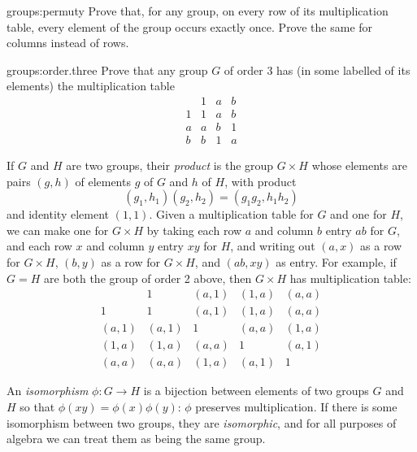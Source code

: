 \begin{problem}{groups:permuty}
Prove that, for any group, on every row of its multiplication table, every element of the group occurs exactly once.
Prove the same for columns instead of rows.
\end{problem}
\begin{problem}{groups:order.three}
Prove that any group \(G\) of order 3 has (in some labelled of its elements) the multiplication table
\[
\begin{array}{c|ccc}
  &  1 & a & b \\ \hline
1 &  1 & a & b \\
a &  a & b & 1 \\
b &  b & 1 & a
\end{array}
\]
\end{problem}

If \(G\) and \(H\) are two groups, their \emph{product} is the group \(G \times H\) whose elements are pairs \((g,h)\) of elements \(g\) of \(G\) and \(h\) of \(H\), with product
\[
(g_1,h_1)(g_2,h_2)=(g_1g_2,h_1h_2)
\]
and identity element \((1,1)\).
Given a multiplication table for \(G\) and one for \(H\), we can make one for \(G \times H\) by taking each row \(a\) and column \(b\) entry \(ab\) for \(G\), and each row \(x\) and column \(y\) entry \(xy\) for \(H\), and writing out \((a,x)\) as a row for \(G \times H\), \((b,y)\) as a row for \(G \times H\), and \((ab,xy)\) as entry.
For example, if \(G=H\) are both the group of order 2 above, then \(G \times H\) has multiplication table:
\[
\begin{array}{c|cccc}
      &     1 & (a,1) & (1,a) & (a,a) \\ \hline
    1 &     1 & (a,1) & (1,a) & (a,a) \\
(a,1) & (a,1) &     1 & (a,a) & (1,a) \\
(1,a) & (1,a) & (a,a) &     1 & (a,1) \\
(a,a) & (a,a) & (1,a) & (a,1) &     1
\end{array}
\]

An \emph{isomorphism} \(\phi \colon G \to H\) is a bijection between elements of two groups \(G\) and \(H\) so that \(\phi(xy)=\phi(x)\phi(y)\): \(\phi\) preserves multiplication.
If there is some isomorphism between two groups, they are \emph{isomorphic}, and for all purposes of algebra we can treat them as being the same group.

